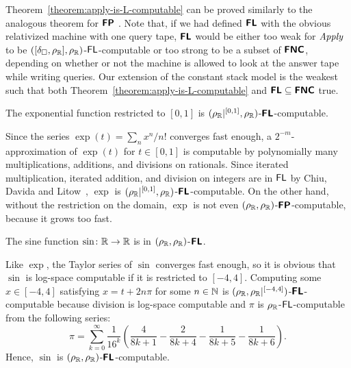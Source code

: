 \documentclass[envcountsame,orivec,oribibl]{llncs}
\begin{document}
Theorem~\ref{theorem:apply-is-L-computable} can be proved 
similarly to the analogous theorem for $\text{\bfseries \sffamily \upshape FP}$ 
\cite{kawamura11:_funct_space_repres_and_polyn_time_comput}. 
Note that, 
if we had defined $\text{\bfseries \sffamily \upshape FL}$ with the obvious relativized machine with one query tape,
$\text{\bfseries \sffamily \upshape FL}$ would be either too weak 
for $\mathit{Apply}$ to be $([\delta _\square,\rho _\mathbb R], \rho _\mathbb R)$-$\mathsf{FL}$-computable or
too strong to be a subset of $\text{\bfseries \sffamily \upshape FNC}$,
depending on whether or not the machine is allowed to look at the answer tape while writing queries.
Our extension of the constant stack model is the weakest
such that both Theorem~\ref{theorem:apply-is-L-computable} and 
$\text{\bfseries \sffamily \upshape FL} \subseteq \text{\bfseries \sffamily \upshape FNC}$ true.


\begin{lemma}
 The exponential function restricted to $[0,1]$
 is $(\rho _\mathbb R|^{[0,1]}, \rho _\mathbb R)$-$\text{\bfseries \sffamily \upshape FL}$-computable.
\end{lemma}
Since the series $\exp(t) = \sum_n x^n / n!$ converges fast enough,
a $2^{-m}$-approximation of $\exp(t)$ for $t \in [0,1]$ is computable 
by polynomially many multiplications, additions, and divisions on rationals.
Since iterated multiplication, iterated addition, and division on integers
are in $\mathsf{FL}$ by Chiu, Davida and Litow~\cite{chiu2001division},
$\exp$ is $(\rho _\mathbb R|^{[0,1]}, \rho _\mathbb R)$-$\text{\bfseries \sffamily \upshape FL}$-computable.
On the other hand, without the restriction on the domain, $\exp$ is not 
even $(\rho _\mathbb R, \rho _\mathbb R)$-$\text{\bfseries \sffamily \upshape FP}$-computable, 
because it grows too fast. 

\begin{lemma}
  The sine function $\sin \colon \mathbb R \to \mathbb R$ is
 in $(\rho _\mathbb R, \rho _\mathbb R)$-$\text{\bfseries \sffamily \upshape FL}$.
\end{lemma}
Like $\exp$, the Taylor series of $\sin$ converges fast enough,
so it is obvious that $\sin$ is log-space computable if it is restricted to $[-4, 4]$.
Computing some $x \in [-4, 4]$ satisfying $x = t + 2n\pi$ for 
some $n \in \mathbb N$ is
$(\rho _\mathbb R, \rho _\mathbb R|^{[-4,4]})$-$\text{\bfseries \sffamily \upshape FL}$-computable because division is log-space computable and $\pi$ is $\rho _\mathbb R$-$\mathsf{FL}$-computable from the following series:
\begin{equation}
 \pi = \sum_{k=0}^\infty \frac{1}{16^k} 
  \left( \frac{4}{8k+1} - \frac{2}{8k+4} - \frac{1}{8k+5} - \frac{1}{8k+6} \right).
\end{equation}
Hence, $\sin$ is $(\rho _\mathbb R, \rho _\mathbb R)$-$\text{\bfseries \sffamily \upshape FL}$-computable.
\end{document}
